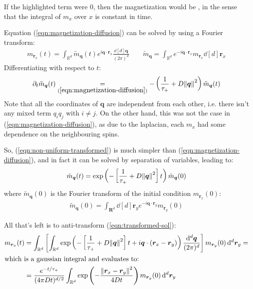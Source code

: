 \documentclass[../../main.tex]{subfiles}
\begin{document}
If the highlighted term were $0$, then the magnetization would be , in the sense that the integral of $m_x$ over $x$ is constant in time.

\medskip

Equation (\ref{eqn:magnetization-diffusion}) can be solved by using a Fourier transform:
\begin{align*}
    m_{\bm{r}_x}(t) = \int_{\mathbb{R}^d} \tilde{m}_{\bm{q}}(t) e^{i \bm{q} \cdot \bm{r}_x} \frac{\dd[d]{\bm{q}}}{(2\pi)^d} \qquad \tilde{m}_{\bm{q}} = \int_{\mathbb{R}^d} e^{-i \bm{q} \cdot \bm{r}_x} m_{\bm{r}_x} \dd[d]{\bm{r}_x}
\end{align*}
Differentiating with respect to $t$:
\begin{align}\label{eqn:non-uniform-transformed}
    \partial_t \tilde{m}_{\bm{q}}(t) \underset{(\ref{eqn:magnetization-diffusion})}{=}  -\left(\frac{1}{\tau_+} + D \norm{\bm{q}}^2\right) \tilde{m}_{\bm{q}}(t)
\end{align}
Note that all the coordinates of $\bm{q}$ are independent from each other, i.e. there isn't any mixed term $q_i q_j$ with $i \neq j$. On the other hand, this was not the case in (\ref{eqn:magnetization-diffusion}), as due to the laplacian, each $m_x$ had some dependence on the neighbouring spins.

\medskip

So, (\ref{eqn:non-uniform-transformed}) is much simpler than (\ref{eqn:magnetization-diffusion}), and in fact it can be solved by separation of variables, leading to:
\begin{align}\label{eqn:transformed-sol}
    \tilde{m}_{\bm{q}}(t) = \exp\left(-\left[\frac{1}{\tau_+} + D \norm{\bm{q}}^2 \right] t\right) \tilde{m}_{\bm{q}}(0)
\end{align}
where $\tilde{m}_{\bm{q}}(0)$ is the Fourier transform of the initial condition $m_{\bm{r}_x}(0)$:
\begin{align*}
    \tilde{m}_{\bm{q}}(0) = \int_{\bm{R}^d} \dd[d]{\bm{r}_y} e^{-i \bm{q} \cdot \bm{r}_y} m_{\bm{r}_y}(0)
\end{align*}

All that's left is to anti-transform (\ref{eqn:transformed-sol}):
\begin{align}\nonumber
    m_{\bm{r}_x}(t) &= \int_{\mathbb{R}^d} \left[ \int_{\mathbb{R}^d} \exp\left(-\left[\frac{1}{\tau_+} + D \norm{\bm{q}}^2 \right] t + i \bm{q} \cdot (\bm{r}_x - \bm{r}_y)\right) \frac{\dd[d]{\bm{q}}}{(2\pi)^d} \right] m_{\bm{r}_y}(0) \dd[d]{\bm{r}_y} =\\
    \shortintertext{which is a gaussian integral and evaluates to:} \label{eqn:non-uniform-sol}
    &= \frac{e^{-t/\tau_+}}{(4 \pi D t)^{d/2}} \int_{\mathbb{R}^d} \exp\left(-\frac{\norm{\bm{r}_x - \bm{r}_y}^2}{4 D t} \right) m_{\bm{r}_y}(0) \dd[d]{\bm{r}_y}
\end{align}
\end{document}
